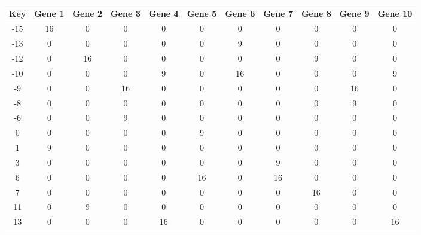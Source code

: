 \begin{tabular}{|c|c|c|c|c|c|c|c|c|c|c|}
\hline
Key & Gene 1 & Gene 2 & Gene 3 & Gene 4 & Gene 5 & Gene 6 & Gene 7 & Gene 8 & Gene 9 & Gene 10 \\
\hline
-15 & 16 & 0 & 0 & 0 & 0 & 0 & 0 & 0 & 0 & 0 \\
-13 & 0 & 0 & 0 & 0 & 0 & 9 & 0 & 0 & 0 & 0 \\
-12 & 0 & 16 & 0 & 0 & 0 & 0 & 0 & 9 & 0 & 0 \\
-10 & 0 & 0 & 0 & 9 & 0 & 16 & 0 & 0 & 0 & 9 \\
-9 & 0 & 0 & 16 & 0 & 0 & 0 & 0 & 0 & 16 & 0 \\
-8 & 0 & 0 & 0 & 0 & 0 & 0 & 0 & 0 & 9 & 0 \\
-6 & 0 & 0 & 9 & 0 & 0 & 0 & 0 & 0 & 0 & 0 \\
0 & 0 & 0 & 0 & 0 & 9 & 0 & 0 & 0 & 0 & 0 \\
1 & 9 & 0 & 0 & 0 & 0 & 0 & 0 & 0 & 0 & 0 \\
3 & 0 & 0 & 0 & 0 & 0 & 0 & 9 & 0 & 0 & 0 \\
6 & 0 & 0 & 0 & 0 & 16 & 0 & 16 & 0 & 0 & 0 \\
7 & 0 & 0 & 0 & 0 & 0 & 0 & 0 & 16 & 0 & 0 \\
11 & 0 & 9 & 0 & 0 & 0 & 0 & 0 & 0 & 0 & 0 \\
13 & 0 & 0 & 0 & 16 & 0 & 0 & 0 & 0 & 0 & 16 \\
\hline
\end{tabular}